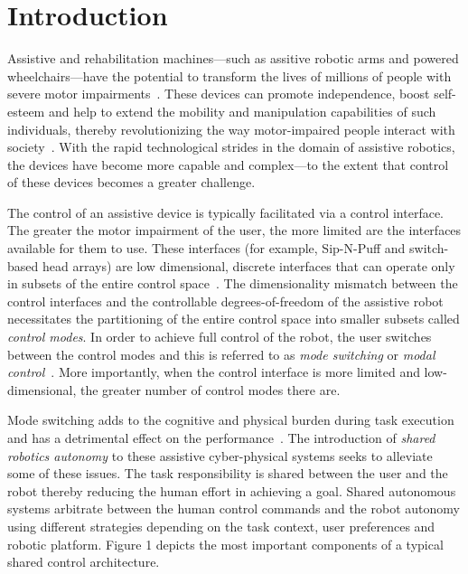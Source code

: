 \section{Introduction}\label{sec:intro}

Assistive and rehabilitation machines---such as assitive robotic arms and powered wheelchairs---have the potential to transform the lives of millions of people with severe motor impairments~\cite{laplante1992assistive}. These devices can promote independence, boost self-esteem and help to extend the mobility and manipulation capabilities of such individuals, thereby revolutionizing the way motor-impaired people interact with society~\cite{scherer1996outcomes, huete2012personal}. With the rapid technological strides in the domain of assistive robotics, the devices have become more capable and complex---to the extent that control of these devices becomes a greater challenge. 

The control of an assistive device is typically facilitated via a control interface. The greater the motor impairment of the user, the more limited are the interfaces available for them to use. These interfaces (for example, Sip-N-Puff and switch-based head arrays) are low dimensional, discrete interfaces that can operate only in subsets of the entire control space~\cite{simpson2008tooth, nuttin2002selection}. 
The dimensionality mismatch between the control interfaces and the controllable degrees-of-freedom of the assistive robot necessitates the partitioning of the entire control space into smaller subsets called \textit{control modes}. In order to achieve full control of the robot, the user switches between the control modes and this is referred to as \textit{mode switching} or \textit{modal control}~\cite{herlant2016assistive}. More importantly, when the control interface is more limited and low-dimensional, the greater number of control modes there are. 

Mode switching adds to the cognitive and physical burden during task execution and has a detrimental effect on the performance~\cite{eftring1999technical}. The introduction of \textit{shared robotics autonomy} to these assistive cyber-physical systems seeks to alleviate some of these issues. The task responsibility is shared between the user and the robot thereby reducing the human effort in achieving a goal. Shared autonomous systems arbitrate between the human control commands and the robot autonomy using different strategies depending on the task context, user preferences and robotic platform. Figure 1 depicts the most important components of a  typical shared control architecture.

